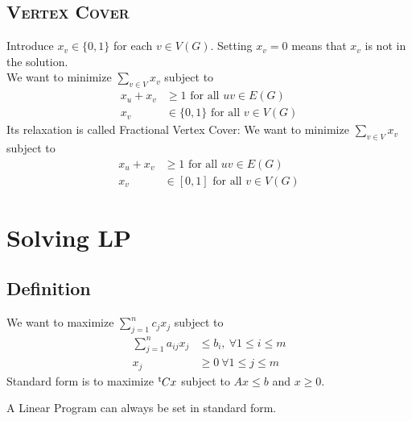 \documentclass[12pt]{cours}
\begin{document}
\subsection{\textsc{Vertex Cover}}
\begin{proposition}
    Introduce $x_{v} \in \{0, 1\}$ for each $v \in V(G)$. Setting $x_{v} = 0$ means that $x_{v}$ is not in the solution.\\
    We want to minimize $\sum_{v \in V}x_{v}$ subject to 
    \[
        \begin{aligned}
            x_{u} + x_{v} &\geq 1 \text{  for all } uv \in E(G)\\
            x_{v} &\in \{0, 1\}  \text{  for all } v \in V(G)
        \end{aligned}
    \]
    Its relaxation is called Fractional Vertex Cover: 
    We want to minimize $\sum_{v \in V}x_{v}$ subject to 
    \[
        \begin{aligned}
            x_{u} + x_{v} &\geq 1 \text{  for all } uv \in E(G)\\
            x_{v} &\in \left[0, 1\right]  \text{  for all } v \in V(G)
        \end{aligned}
    \]
\end{proposition}

\section{Solving LP}
\subsection{Definition}
\begin{definition}
    We want to maximize $\sum_{j = 1}^{n} c_{j}x_{j}$ subject to 
    \[
        \begin{aligned}
            \sum_{j = 1}^{n}a_{ij}x_{j} &\leq b_{i}, \ \forall 1 \leq i \leq m\\
            x_{j} &\geq 0 \ \forall 1 \leq j \leq m
        \end{aligned}
    \]
    Standard form is to maximize ${^{\mathsf{t}}}Cx$ subject to $Ax \leq b$ and $x \geq 0$.\\
\end{definition}

\begin{proposition}
    A Linear Program can always be set in standard form.
\end{proposition}
\end{document}
